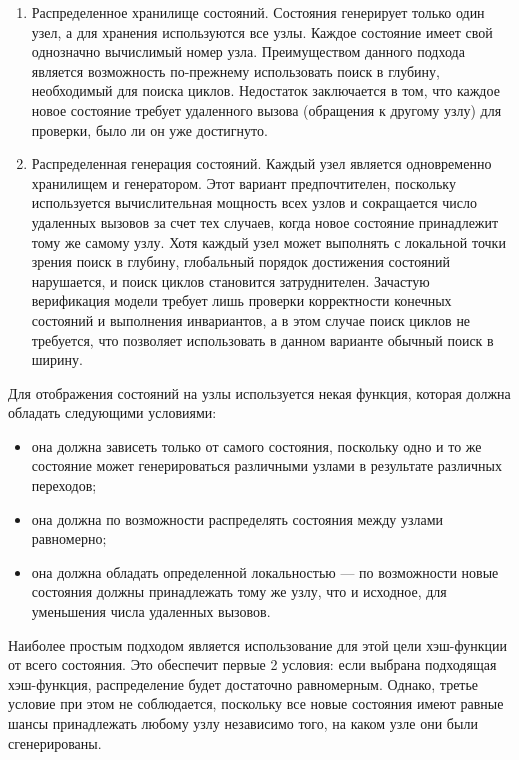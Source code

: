 \documentclass[a4paper,12pt,notitlepage]{article}
\begin{document}
\begin{enumerate}
\item Распределенное хранилище состояний. Состояния генерирует только
  один узел, а для хранения используются все узлы. Каждое состояние
  имеет свой однозначно вычислимый номер узла. Преимуществом данного
  подхода является возможность по-прежнему использовать поиск в
  глубину, необходимый для поиска циклов. Недостаток заключается в
  том, что каждое новое состояние требует удаленного вызова (обращения
  к другому узлу) для проверки, было ли он уже достигнуто.

\item Распределенная генерация состояний. Каждый узел является
  одновременно хранилищем и генератором. Этот вариант предпочтителен,
  поскольку используется вычислительная мощность всех узлов и
  сокращается число удаленных вызовов за счет тех случаев, когда новое
  состояние принадлежит тому же самому узлу. Хотя каждый узел может
  выполнять с локальной точки зрения поиск в глубину, глобальный
  порядок достижения состояний нарушается, и поиск циклов становится
  затруднителен. Зачастую верификация модели требует лишь
  проверки корректности конечных состояний и выполнения инвариантов, а
  в этом случае поиск циклов не требуется, что позволяет использовать
  в данном варианте обычный поиск в ширину.
\end{enumerate}

Для отображения состояний на узлы используется некая функция, которая
должна обладать следующими условиями:

\begin{itemize}
\item она должна зависеть только от самого состояния, поскольку одно и
  то же состояние может генерироваться различными узлами в результате
  различных переходов;

\item она должна по возможности распределять состояния между узлами
  равномерно;

\item она должна обладать определенной локальностью — по возможности
  новые состояния должны принадлежать тому же узлу, что и исходное,
  для уменьшения числа удаленных вызовов.
\end{itemize}

Наиболее простым подходом является использование для этой цели
хэш-функции от всего состояния. Это обеспечит первые 2 условия: если
выбрана подходящая хэш-функция, распределение будет достаточно
равномерным. Однако, третье условие при этом не соблюдается, поскольку
все новые состояния имеют равные шансы принадлежать любому узлу
независимо того, на каком узле они были сгенерированы.
\end{document}
